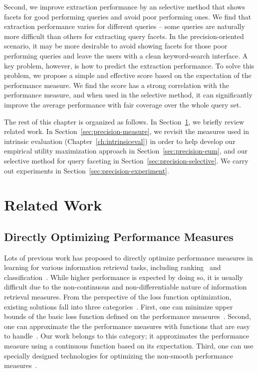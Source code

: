 Second, we improve extraction performance by an selective method that shows facets for good performing queries and avoid poor performing ones. We find that extraction performance varies for different queries -- some queries are naturally more difficult than others for extracting query facets. In the precision-oriented scenario, it may be more desirable to avoid showing facets for those poor performing queries and leave the users with a clean keyword-search interface. A key problem, however, is how to predict the extraction performance. To solve this problem, we propose a simple and effective score based on the expectation of the performance measure. We find the score has a strong correlation with the performance measure, and when used in the selective method, it can significantly improve the average performance with fair coverage over the whole query set.

The rest of this chapter is organized as follows. In Section~\ref{sec:precision-related}, we briefly review related work. In Section~\ref{sec:precision-measure}, we revisit the \PRF measures used in intrinsic evaluation (Chapter~\ref{ch:intrinsiceval}) in order to help develop our empirical utility maximization approach in Section~\ref{sec:precision-eum}, and our selective method for query faceting in Section~\ref{sec:precision-selective}. We carry out experiments in Section~\ref{sec:precision-experiment}.
\section{Related Work}
\label{sec:precision-related}
\subsection{Directly Optimizing Performance Measures}
Lots of previous work has proposed to directly optimize performance measures in learning for various information retrieval tasks, including ranking~\cite{xu2008directly,xu2007adarank,cossock2006subset,quoc2007learning,de2007combined} and classification~\cite{musicant2003optimizing,joachims2005support,jansche2005maximum}. While higher performance is expected by doing so, it is usually difficult due to the non-continuous and non-differentiable nature of information retrieval measures. From the perspective of the loss function optimization, existing solutions fall into three categories~\cite{xu2008directly}. First, one can minimize upper bounds of the basic loss function defined on the performance measures~\cite{xu2007adarank,joachims2005support,yue2007support}. Second, one can approximate the the performance measures with functions that are easy to handle~\cite{jansche2005maximum,cossock2006subset}. Our work belongs to this category; it approximates the performance measure using a continuous function based on 
its expectation. Third, one can use specially designed technologies for optimizing the non-smooth performance measures~\cite{quoc2007learning,de2007combined}. 

